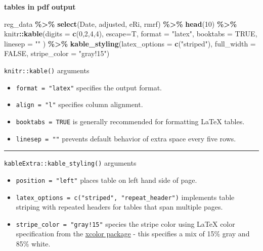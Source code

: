 \documentclass[
  a4paper,
  twoside,
  openright]{book}
\newenvironment{Shaded}{\begin{snugshade}}{\end{snugshade}}
\newcommand{\AttributeTok}[1]{\textcolor[rgb]{0.13,0.29,0.53}{#1}}
\newcommand{\ConstantTok}[1]{\textcolor[rgb]{0.56,0.35,0.01}{#1}}
\newcommand{\DecValTok}[1]{\textcolor[rgb]{0.00,0.00,0.81}{#1}}
\newcommand{\FunctionTok}[1]{\textcolor[rgb]{0.13,0.29,0.53}{\textbf{#1}}}
\newcommand{\NormalTok}[1]{#1}
\newcommand{\SpecialCharTok}[1]{\textcolor[rgb]{0.81,0.36,0.00}{\textbf{#1}}}
\newcommand{\StringTok}[1]{\textcolor[rgb]{0.31,0.60,0.02}{#1}}
\providecommand{\tightlist}{%
  \setlength{\itemsep}{0pt}\setlength{\parskip}{0pt}}
\theoremstyle{definition}
\theoremstyle{definition}
\theoremstyle{definition}
\theoremstyle{definition}
\theoremstyle{remark}
\begin{document}
\textbf{tables in pdf output}

\begin{Shaded}
\begin{Highlighting}[]
\NormalTok{reg\_data }\SpecialCharTok{\%\textgreater{}\%} 
    \FunctionTok{select}\NormalTok{(Date, adjusted, eRi, rmrf) }\SpecialCharTok{\%\textgreater{}\%}
    \FunctionTok{head}\NormalTok{(}\DecValTok{10}\NormalTok{) }\SpecialCharTok{\%\textgreater{}\%} 
\NormalTok{    knitr}\SpecialCharTok{::}\FunctionTok{kable}\NormalTok{(}\AttributeTok{digits =} \FunctionTok{c}\NormalTok{(}\DecValTok{0}\NormalTok{,}\DecValTok{2}\NormalTok{,}\DecValTok{4}\NormalTok{,}\DecValTok{4}\NormalTok{), }\AttributeTok{escape=}\NormalTok{T, }\AttributeTok{format =} \StringTok{"latex"}\NormalTok{, }\AttributeTok{booktabs =} \ConstantTok{TRUE}\NormalTok{, }\AttributeTok{linesep =} \StringTok{""}\NormalTok{ ) }\SpecialCharTok{\%\textgreater{}\%}
    \FunctionTok{kable\_styling}\NormalTok{(}\AttributeTok{latex\_options =} \FunctionTok{c}\NormalTok{(}\StringTok{"striped"}\NormalTok{), }\AttributeTok{full\_width =} \ConstantTok{FALSE}\NormalTok{, }\AttributeTok{stripe\_color =} \StringTok{"gray!15"}\NormalTok{)}
\end{Highlighting}
\end{Shaded}

\texttt{knitr::kable()} arguments

\begin{itemize}
\item
  \texttt{format\ =\ "latex"} specifies the output format.
\item
  \texttt{align\ =\ "l"} specifies column alignment.
\item
  \texttt{booktabs\ =\ TRUE} is generally recommended for formatting LaTeX tables.
\item
  \texttt{linesep\ =\ ""} prevents default behavior of extra space every five rows.
\end{itemize}

\begin{center}\rule{0.5\linewidth}{0.5pt}\end{center}

\texttt{kableExtra::kable\_styling()} arguments

\begin{itemize}
\tightlist
\item
  \texttt{position\ =\ "left"} places table on left hand side of page.
\item
  \texttt{latex\_options\ =\ c("striped",\ "repeat\_header")} implements table striping with repeated headers for tables that span multiple pages.
\item
  \texttt{stripe\_color\ =\ "gray!15"} species the stripe color using LaTeX color specification from the \href{https://mirror.mwt.me/ctan/macros/latex/contrib/xcolor/xcolor.pdf}{xcolor package} - this specifies a mix of 15\% gray and 85\% white.
\end{itemize}
\end{document}
